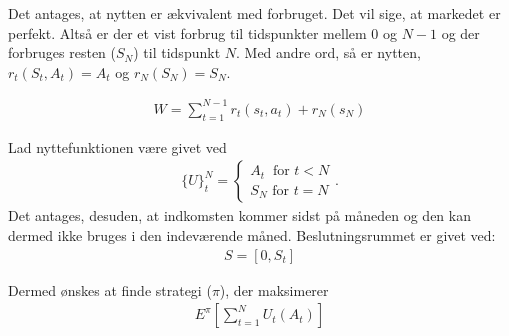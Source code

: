 


%
%
%

Det antages, at nytten er ækvivalent med forbruget. Det vil sige, at markedet er perfekt. Altså er der et vist forbrug til tidspunkter mellem 0 og $N-1$ og der forbruges resten ($S_N$) til tidspunkt $N$. Med andre ord, så er nytten, $r_t(S_t,A_t)=A_t$ og $r_N(S_N)=S_N$.


\begin{align*}
    W=\sum_{t=1}^{N-1} r_t(s_t,a_t)+ r_N(s_N)
\end{align*}

Lad nyttefunktionen være givet ved
\begin{align*}
    \{U\}_t^N=\begin{cases}A_t\ \text{ for } t<N\\ S_N \text{ for } t=N \end{cases}.
\end{align*}
Det antages, desuden, at indkomsten kommer sidst på måneden og den kan dermed ikke bruges i den indeværende måned. Beslutningsrummet er givet ved:
\begin{align*}
    S=[0,S_t]
\end{align*}

Dermed ønskes at finde strategi ($\pi$), der maksimerer
\begin{align*}
    E^\pi \left[\sum_{t=1}^N U_t(A_t)\right]
\end{align*}





